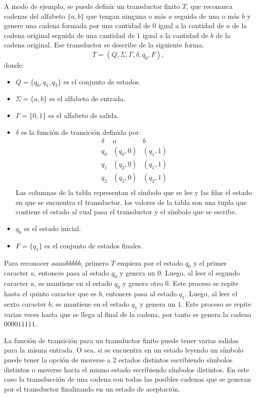 \documentclass[12pt]{article}
\begin{document}
A modo de ejemplo, se puede definir un transductor finito $T$, que reconozca cadenas del alfabeto $\{a,b\}$ que tengan ninguna o más $a$ seguida de una o más $b$ y genere una cadena formada por una cantidad de $0$ igual a la cantidad de $a$ de la cadena original seguida de una cantidad de $1$ igual a la cantidad de $b$ de la cadena original. Ese transductor se describe de la siguiente forma.
\[
  T = (Q, \Sigma, \Gamma, \delta, q_0, F),
\]
donde:
\begin{itemize}
  \item \(Q = \{q_0, q_1, q_2\}\) es el conjunto de estados.
  \item \(\Sigma = \{a, b\}\) es el alfabeto de entrada.
  \item \(\Gamma = \{0, 1\}\) es el alfabeto de salida.
  \item \(\delta\) es la función de transición definida por:
        \[
          \begin{array}{c|c|c}
            \delta & a        & b        \\
            \hline
            q_0    & (q_0, 0) & (q_1, 1) \\
            q_1    & (q_2, 0) & (q_1, 1) \\
            q_2    & (q_2, 0) & (q_2, 1) \\
          \end{array}
        \]
        Las columnas de la tabla representan el símbolo que se lee y las filas el estado en que se encuentra el transductor, 
        los valores de la tabla son una tupla que contiene el estado al cual pasa el transductor y el símbolo que se escribe.
  \item \(q_0\) es el estado inicial.
  \item \(F = \{q_1\}\) es el conjunto de estados finales.
\end{itemize}

Para reconocer $aaaabbbbb$, primero $T$ empieza por el estado $q_0$ y el primer caracter $a$, entonces pasa al estado $q_0$ y genera un $0$.
Luego, al leer el segundo caracter $a$, se mantiene en el estado $q_0$ y genera otro $0$. Este proceso se repite hasta el quinto caracter
que es $b$, entonces pasa al estado $q_1$. Luego, al leer el sexto caracter $b$, se mantiene en el estado $q_1$ y genera un $1$. Este proceso
se repite varias veces hasta que se llega al final de la cadena, por tanto se genera la cadena $000011111$.

La función de transición para un transductor finito puede tener varias salidas para la misma entrada. O sea, si se encuentra en un estado leyendo un símbolo
puede tener la opción de moverse a 2 estados distintos escribiendo símbolos distintos o moverse hacia el mismo estado 
escribiendo símbolos distintos. En este caso la transducción de una cadena son todas las posibles cadenas que se generan
por el transductor finalizando en un estado de aceptación.
\end{document}
